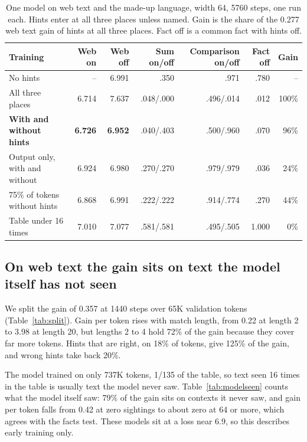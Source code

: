 \documentclass[11pt]{article}
\begin{document}
\begin{table}[h]\centering\small
\begin{tabular}{lrrrrrr}\toprule
Training & Web on & Web off & Sum on/off & Comparison on/off & Fact off & Gain\\\midrule
No hints & -- & 6.991 & .350 & .971 & .780 & --\\
All three places & 6.714 & 7.637 & .048/.000 & .496/.014 & .012 & 100\%\\
\textbf{With and without hints} & \textbf{6.726} & \textbf{6.952} & .040/.403 & .500/.960 & .070 & 96\%\\
Output only, with and without & 6.924 & 6.980 & .270/.270 & .979/.979 & .036 & 24\%\\
75\% of tokens without hints & 6.868 & 6.991 & .222/.222 & .914/.774 & .270 & 44\%\\
Table under 16 times & 7.010 & 7.077 & .581/.581 & .495/.505 & 1.000 & 0\%\\
\end{tabular}
\caption{One model on web text and the made-up language, width 64, 5760 steps, one run each. Hints enter at all three places unless named. Gain is the share of the 0.277 web text gain of hints at all three places. Fact off is a common fact with hints off.}\label{tab:fix}
\end{table}

\subsection{On web text the gain sits on text the model itself has not seen}
We split the gain of 0.357 at 1440 steps over 65K validation tokens (Table~\ref{tab:split}). Gain per token rises with match length, from 0.22 at length 2 to 3.98 at length 20, but lengths 2 to 4 hold 72\% of the gain because they cover far more tokens. Hints that are right, on 18\% of tokens, give 125\% of the gain, and wrong hints take back 20\%.

The model trained on only 737K tokens, 1/135 of the table, so text seen 16 times in the table is usually text the model never saw. Table~\ref{tab:modelseen} counts what the model itself saw: 79\% of the gain sits on contexts it never saw, and gain per token falls from 0.42 at zero sightings to about zero at 64 or more, which agrees with the facts test. These models sit at a loss near 6.9, so this describes early training only.
\end{document}
